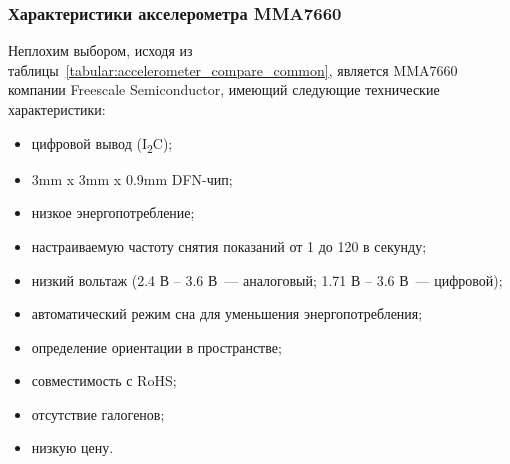 \documentclass[document.tex]{subfiles}
\begin{document}
\begin{table}[h]
\medskip
{}
\medskip
\caption{Общие характеристики цифровых акселерометров}
\label{tabular:accelerometer_compare_common}
\end{table}

\clearpage
\subsubsection{Характеристики акселерометра MMA7660}
Неплохим выбором, исходя из таблицы~\ref{tabular:accelerometer_compare_common}, является MMA7660 компании Freescale Semiconductor, имеющий следующие технические характеристики:
\begin{itemize}
	\item цифровой вывод (I\textsubscript{2}C);
	\item 3mm x 3mm x 0.9mm DFN-чип; 
	\item низкое энергопотребление;
	\item настраиваемую частоту снятия показаний от 1 до 120 в секунду;
	\item низкий вольтаж (2.4 В -- 3.6 В~--- аналоговый; 1.71 В -- 3.6 В~--- цифровой);
	\item автоматический режим сна для уменьшения энергопотребления;
	\item определение ориентации в пространстве;
	\item совместимость с RoHS;
	\item отсутствие галогенов;
	\item низкую цену.
\end{itemize}
\end{document}
